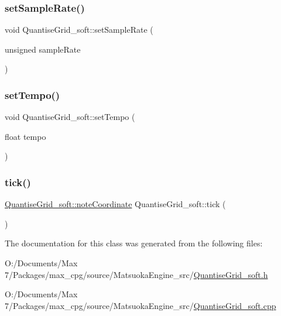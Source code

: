 \subsubsection{\texorpdfstring{set\+Sample\+Rate()}{setSampleRate()}}
{\footnotesize\ttfamily void Quantise\+Grid\+\_\+soft\+::set\+Sample\+Rate (\begin{DoxyParamCaption}\item[{unsigned}]{sample\+Rate }\end{DoxyParamCaption})}

\mbox{\label{classQuantiseGrid__soft_a49a982952228b5b76a99911d0fbcf1ab}} 
\subsubsection{\texorpdfstring{set\+Tempo()}{setTempo()}}
{\footnotesize\ttfamily void Quantise\+Grid\+\_\+soft\+::set\+Tempo (\begin{DoxyParamCaption}\item[{float}]{tempo }\end{DoxyParamCaption})}

\mbox{\label{classQuantiseGrid__soft_a2af018d83f17638adb6483c85b67435f}} 
\subsubsection{\texorpdfstring{tick()}{tick()}}
{\footnotesize\ttfamily \mbox{\hyperlink{structQuantiseGrid__soft_1_1noteCoordinate}{Quantise\+Grid\+\_\+soft\+::note\+Coordinate}} Quantise\+Grid\+\_\+soft\+::tick (\begin{DoxyParamCaption}{ }\end{DoxyParamCaption})}



The documentation for this class was generated from the following files\+:\begin{DoxyCompactItemize}
\item 
O\+:/\+Documents/\+Max 7/\+Packages/max\+\_\+cpg/source/\+Matsuoka\+Engine\+\_\+src/\mbox{\hyperlink{QuantiseGrid__soft_8h}{Quantise\+Grid\+\_\+soft.\+h}}\item 
O\+:/\+Documents/\+Max 7/\+Packages/max\+\_\+cpg/source/\+Matsuoka\+Engine\+\_\+src/\mbox{\hyperlink{QuantiseGrid__soft_8cpp}{Quantise\+Grid\+\_\+soft.\+cpp}}\end{DoxyCompactItemize}
